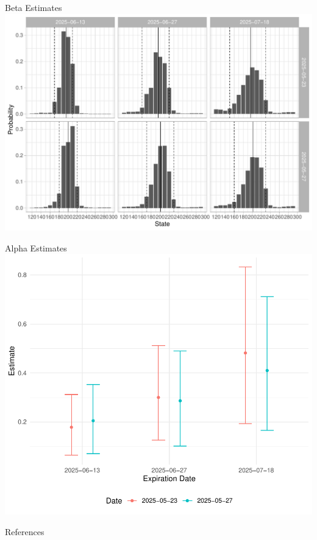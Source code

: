 \documentclass[10pt,aspectratio=43]{beamer}
\begin{document}
\begin{frame}{Beta Estimates}\centering
    \includegraphics[width=\linewidth]{betas.pdf}
\end{frame}

\begin{frame}{Alpha Estimates}
    \includegraphics[scale=0.6]{alphas.pdf}
\end{frame}

\lastslide

\begin{frame}[allowframebreaks]{References}
    \renewcommand*{\bibfont}{\scriptsize}
    \printbibliography
\end{frame}

\appendix 

\begin{frame}
    
\end{frame}
\end{document}
